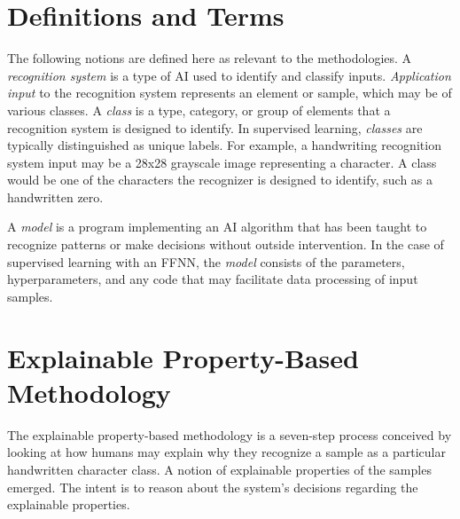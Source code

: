 

\section{Definitions and Terms}

The following notions are defined here as relevant to the methodologies. A
\textit{recognition system} is a type of AI used to identify and classify
inputs. \textit{Application input} to the recognition system represents an
element or sample, which may be of various classes. A \textit{class} is a type,
category, or group of elements that a recognition system is designed to
identify. In supervised learning, \textit{classes} are typically distinguished
as unique labels. For example, a handwriting recognition system input may be a
28x28 grayscale image representing a character. A class would be one of the
characters the recognizer is designed to identify, such as a handwritten zero.

A \textit{model} is a program implementing an AI algorithm that has been taught
to recognize patterns or make decisions without outside intervention. In the
case of supervised learning with an FFNN, the \textit{model} consists of the
parameters, hyperparameters, and any code that may facilitate data processing of
input samples.



% 

\section{Explainable Property-Based Methodology}

The explainable property-based methodology is a seven-step process conceived by
looking at how humans may explain why they recognize a sample as a particular
handwritten character class. A notion of explainable properties of the samples
emerged. The intent is to reason about the system's decisions regarding the
explainable properties.

